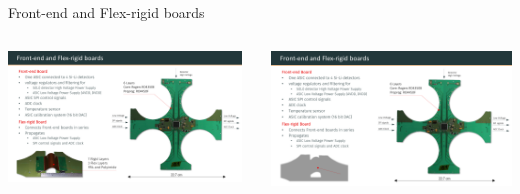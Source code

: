 \documentclass[aspectratio=169,xcolor=dvipsnames,handout]{beamer} %
\newcommand{\backupend}{
   \setcounter{framenumber}{\value{finalframe}}
}
\begin{document}
\begin{frame}{Front-end and Flex-rigid boards}
\begin{columns}
            \centering
            \includegraphics[width=0.97\textwidth]{images/backup_slides/flex_rigid_description.pdf}
          
            \includegraphics[width=1.05\textwidth]{images/backup_slides/feb_signals.pdf}
            \vspace{-0.5cm}
            
    \end{columns}
    
\end{frame}

\backupend
\end{document}
